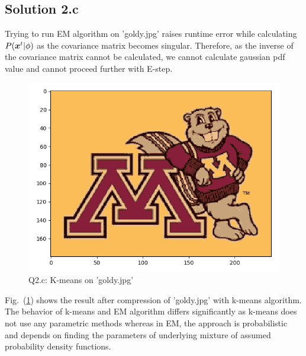 \subsection*{Solution 2.c}
Trying to run EM algorithm on 'goldy.jpg' raises runtime error while calculating $P(\boldsymbol{x}^t|\phi)$ as the covariance matrix becomes singular. Therefore, as the inverse of the covariance matrix cannot be calculated, we cannot calculate gaussian pdf value and cannot proceed further with E-step.
\begin{figure}[h!]
	\centering
	\includegraphics[scale=0.5]{q2_c_goldy_kmeans}
	\caption{Q2.c: K-means on 'goldy.jpg'}
	\label{fig:2c_goldy}
\end{figure}
Fig.~(\ref{fig:2c_goldy}) shows the result after compression of 'goldy.jpg' with k-means algorithm. The behavior of k-means and EM algorithm differs significantly as k-means does not use any parametric methods whereas in EM, the approach is probabilistic and depends on finding the parameters of underlying mixture of assumed probability density functions. 
\newpage


